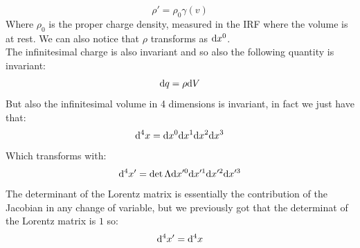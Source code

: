 \begin{equation}
  \boxed{\rho' = \rho_0 \gamma(v)}
\end{equation}
Where $\rho_0$ is the proper charge density, measured in the IRF where the volume is at rest. We can also notice that $\rho$ transforms as $\mathrm{d}x^0$.\\
The infinitesimal charge is also invariant and so also the following quantity is invariant:
\begin{equation}
  \mathrm{d}q = \rho \mathrm{d}V
\end{equation}
But also the infinitesimal volume in 4 dimensions is invariant, in fact we just have that:
\begin{equation}
  \mathrm{d}^4x = \mathrm{d}x^0\mathrm{d}x^1\mathrm{d}x^2\mathrm{d}x^3
\end{equation}
Which transforms with:
\begin{equation}
  \mathrm{d}^4x' = \det \Lambda \mathrm{d}x'^0\mathrm{d}x'^1\mathrm{d}x'^2\mathrm{d}x'^3
\end{equation}
The determinant of the Lorentz matrix is essentially the contribution of the Jacobian in any change of variable, but we previously got that the determinat of the Lorentz matrix is $1$ so:
\begin{equation}
  \mathrm{d}^4x' = \mathrm{d}^4x
\end{equation}

